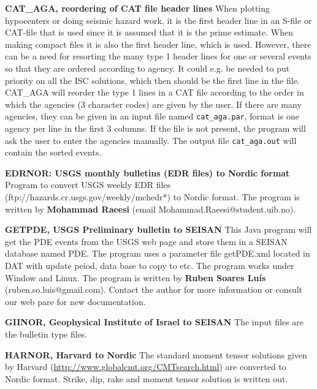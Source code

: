 \textbf{CAT\_AGA, reordering of CAT file header lines}\newline
{}
When plotting hypocenters or doing seismic hazard work, it is the first header line in an S-file or CAT-file that is used since it is assumed that it is the prime estimate. When making compact files it is also the first header line, which is used. However, there can be a need for resorting the many type 1 
header lines for one or several events so that they are ordered according to agency. It could e.g. be needed to put priority on all the ISC solutions, which then should be the first line in the file. CAT\_AGA will reorder the type 1 lines in a CAT file according to the order in which the agencies (3 character codes) are given by the user. If there are many agencies, they can be given in an input file named \texttt{cat\_aga.par}, format is one agency per line in the first 3 columns. If the file is not present, the program will ask the user to enter the agencies manually. 
 The output file \texttt{cat\_aga.out} will contain the sorted events. 

\textbf{EDRNOR: USGS monthly bulletins (EDR files) to Nordic format}\newline
{}
Program to convert USGS weekly EDR files (ftp://hazards.cr.usgs.gov/weekly/mchedr*) to Nordic format. The program is written by \textbf{Mohammad Raeesi} (email Mohammad.Raeesi@student.uib.no). 

\textbf{GETPDE, USGS Preliminary bulletin to SEISAN}\newline
\label{page:getpde}
This Java program will get the PDE events from the USGS web page and store them
in a SEISAN database named PDE. 
The program uses a parameter file getPDE.xml located in DAT with update peiod, data base to copy to etc. The program works under Window and Linux.
The program is written by \textbf{Ruben Soares Lu\'is} (ruben.so.luis@gmail.com). Contact the author for more information or consult our web pare for new documentation. 

\textbf{GIINOR, Geophysical Institute of Israel to SEISAN}\newline
The input files are the bulletin type files.

\textbf{HARNOR, Harvard to Nordic }\newline
The standard moment tensor solutions given by Harvard (\url{http://www.globalcmt.org/CMTsearch.html}) are converted to Nordic format. Strike, dip,  rake  and moment tensor solution is written out.


